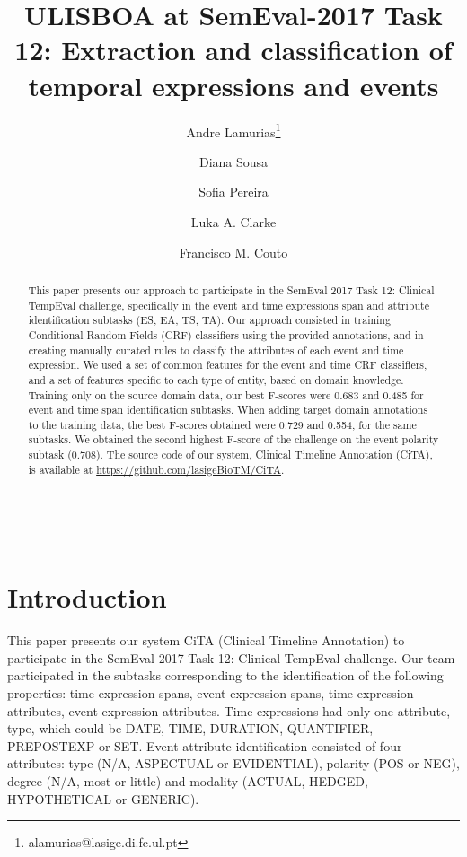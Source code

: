 \documentclass[11pt,a4paper]{article}
\title{ULISBOA at SemEval-2017 Task 12:  Extraction and classification of temporal expressions and events}
\author[1]{Andre Lamurias\thanks{ alamurias@lasige.di.fc.ul.pt}}
\author[1]{Diana Sousa}
\author[1]{Sofia Pereira}
\author[2]{Luka A. Clarke}
\author[1]{Francisco M. Couto}
\affil[1]{LaSIGE, Faculdade de Ci\^{e}ncias, Universidade de Lisboa, Portugal}
\affil[2]{BioISI: Biosystems \& Integrative Sciences Institute, \protect \\
          Faculdade de Ci\^{e}ncias, Universidade de Lisboa, Portugal}
\date{}
\begin{document}
\maketitle
\begin{abstract}
  This paper presents our approach to participate in the SemEval 2017 Task 12: Clinical TempEval challenge, specifically in the event and time expressions span and attribute identification subtasks (ES, EA, TS, TA).
  Our approach consisted in training Conditional Random Fields (CRF) classifiers using the provided annotations, and in creating manually curated rules to classify the attributes of each event and time expression.
  We used a set of common features for the event and time CRF classifiers, and a set of features specific to each type of entity, based on domain knowledge.
  Training only on the source domain data, our best F-scores were 0.683 and 0.485 for event and time span identification subtasks.
  When adding target domain annotations to the training data, the best F-scores obtained were 0.729 and 0.554, for the same subtasks.
  We obtained the second highest F-score of the challenge on the event polarity subtask (0.708).
  The source code of our system, Clinical Timeline Annotation (CiTA), is available at \url{https://github.com/lasigeBioTM/CiTA}.
  
  
\end{abstract}

\

\section{Introduction}

This paper presents our system CiTA (Clinical Timeline Annotation) to participate in the SemEval 2017 Task 12: Clinical TempEval challenge.
Our team participated in the subtasks corresponding to the identification of the following properties: time expression spans, event expression spans, time expression attributes, event expression attributes. 
Time expressions had only one attribute, type, which could be DATE, TIME, DURATION, QUANTIFIER, PREPOSTEXP or SET.
Event attribute identification consisted of four attributes: type (N/A, ASPECTUAL or EVIDENTIAL), polarity (POS or NEG), degree (N/A, most or little) and modality (ACTUAL, HEDGED, HYPOTHETICAL or GENERIC).
\end{document}
